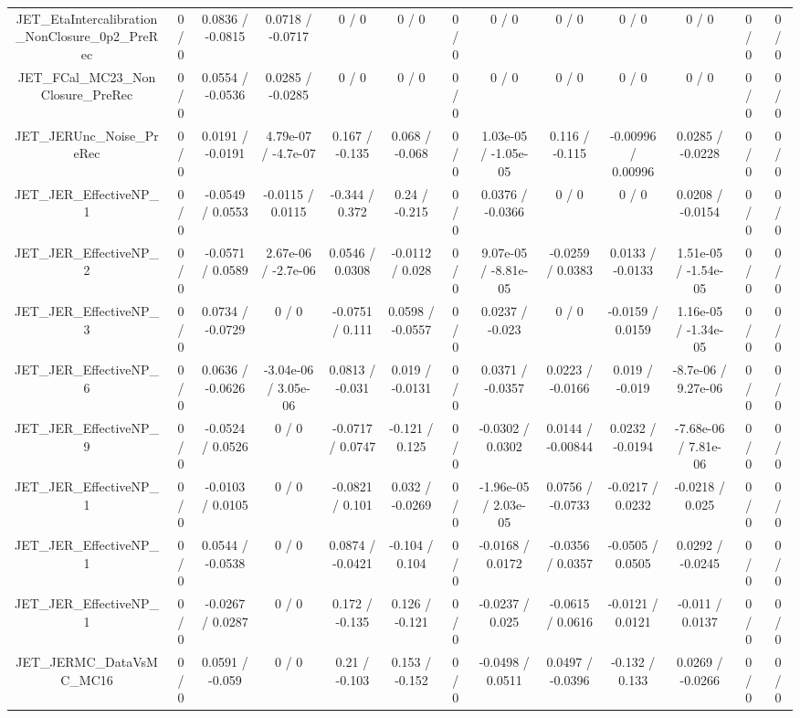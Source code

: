 \documentclass[10pt]{article}
\begin{document}
\begin{table}[htbp]
\begin{center}
\begin{tabular}{|c|c|c|c|c|c|c|c|c|c|c|c|c|}
  JET_EtaIntercalibration_NonClosure_0p2_PreRec & 0 / 0 & 0.0836 / -0.0815 & 0.0718 / -0.0717 & 0 / 0 & 0 / 0 & 0 / 0 & 0 / 0 & 0 / 0 & 0 / 0 & 0 / 0 & 0 / 0 & 0 / 0 \\ 
  JET_FCal_MC23_NonClosure_PreRec & 0 / 0 & 0.0554 / -0.0536 & 0.0285 / -0.0285 & 0 / 0 & 0 / 0 & 0 / 0 & 0 / 0 & 0 / 0 & 0 / 0 & 0 / 0 & 0 / 0 & 0 / 0 \\ 
  JET_JERUnc_Noise_PreRec & 0 / 0 & 0.0191 / -0.0191 & 4.79e-07 / -4.7e-07 & 0.167 / -0.135 & 0.068 / -0.068 & 0 / 0 & 1.03e-05 / -1.05e-05 & 0.116 / -0.115 & -0.00996 / 0.00996 & 0.0285 / -0.0228 & 0 / 0 & 0 / 0 \\ 
  JET_JER_EffectiveNP_1 & 0 / 0 & -0.0549 / 0.0553 & -0.0115 / 0.0115 & -0.344 / 0.372 & 0.24 / -0.215 & 0 / 0 & 0.0376 / -0.0366 & 0 / 0 & 0 / 0 & 0.0208 / -0.0154 & 0 / 0 & 0 / 0 \\ 
  JET_JER_EffectiveNP_2 & 0 / 0 & -0.0571 / 0.0589 & 2.67e-06 / -2.7e-06 & 0.0546 / 0.0308 & -0.0112 / 0.028 & 0 / 0 & 9.07e-05 / -8.81e-05 & -0.0259 / 0.0383 & 0.0133 / -0.0133 & 1.51e-05 / -1.54e-05 & 0 / 0 & 0 / 0 \\ 
  JET_JER_EffectiveNP_3 & 0 / 0 & 0.0734 / -0.0729 & 0 / 0 & -0.0751 / 0.111 & 0.0598 / -0.0557 & 0 / 0 & 0.0237 / -0.023 & 0 / 0 & -0.0159 / 0.0159 & 1.16e-05 / -1.34e-05 & 0 / 0 & 0 / 0 \\ 
  JET_JER_EffectiveNP_6 & 0 / 0 & 0.0636 / -0.0626 & -3.04e-06 / 3.05e-06 & 0.0813 / -0.031 & 0.019 / -0.0131 & 0 / 0 & 0.0371 / -0.0357 & 0.0223 / -0.0166 & 0.019 / -0.019 & -8.7e-06 / 9.27e-06 & 0 / 0 & 0 / 0 \\ 
  JET_JER_EffectiveNP_9 & 0 / 0 & -0.0524 / 0.0526 & 0 / 0 & -0.0717 / 0.0747 & -0.121 / 0.125 & 0 / 0 & -0.0302 / 0.0302 & 0.0144 / -0.00844 & 0.0232 / -0.0194 & -7.68e-06 / 7.81e-06 & 0 / 0 & 0 / 0 \\ 
  JET_JER_EffectiveNP_1 & 0 / 0 & -0.0103 / 0.0105 & 0 / 0 & -0.0821 / 0.101 & 0.032 / -0.0269 & 0 / 0 & -1.96e-05 / 2.03e-05 & 0.0756 / -0.0733 & -0.0217 / 0.0232 & -0.0218 / 0.025 & 0 / 0 & 0 / 0 \\ 
  JET_JER_EffectiveNP_1 & 0 / 0 & 0.0544 / -0.0538 & 0 / 0 & 0.0874 / -0.0421 & -0.104 / 0.104 & 0 / 0 & -0.0168 / 0.0172 & -0.0356 / 0.0357 & -0.0505 / 0.0505 & 0.0292 / -0.0245 & 0 / 0 & 0 / 0 \\ 
  JET_JER_EffectiveNP_1 & 0 / 0 & -0.0267 / 0.0287 & 0 / 0 & 0.172 / -0.135 & 0.126 / -0.121 & 0 / 0 & -0.0237 / 0.025 & -0.0615 / 0.0616 & -0.0121 / 0.0121 & -0.011 / 0.0137 & 0 / 0 & 0 / 0 \\ 
  JET_JERMC_DataVsMC_MC16 & 0 / 0 & 0.0591 / -0.059 & 0 / 0 & 0.21 / -0.103 & 0.153 / -0.152 & 0 / 0 & -0.0498 / 0.0511 & 0.0497 / -0.0396 & -0.132 / 0.133 & 0.0269 / -0.0266 & 0 / 0 & 0 / 0 \\ 

\end{tabular}
\end{center}
\end{table}
\end{document}

